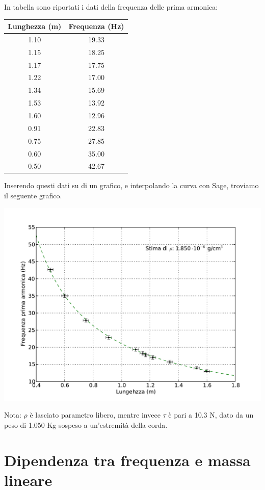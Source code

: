 In tabella sono riportati i dati della frequenza delle prima armonica:

\begin{center}
\begin{tabular}{|c|c|}
\toprule
Lunghezza (m) & Frequenza (Hz) \\
\midrule
1.10 & 19.33 \\
1.15 & 18.25 \\
1.17 & 17.75 \\
1.22 & 17.00 \\
1.34 & 15.69 \\
1.53 & 13.92 \\
1.60 & 12.96 \\
0.91 & 22.83 \\
0.75 & 27.85 \\
0.60 & 35.00 \\
0.50 & 42.67 \\
\bottomrule
\end{tabular}
\end{center}

Inserendo questi dati su di un grafico, e interpolando la curva con Sage, troviamo il seguente grafico.

\includegraphics[scale=0.75]{"../grafici/CordaPrimaArmonica"}

Nota: $\rho$ è lasciato parametro libero, mentre invece $\tau$ è pari a 10.3 N, dato da un peso di 1.050 Kg sospeso a un'estremità della corda.

\section{Dipendenza tra frequenza e massa lineare}
